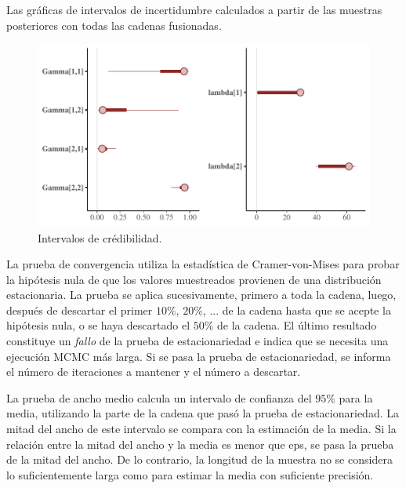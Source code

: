 \documentclass[a4paper]{article}\usepackage[]{graphicx}\usepackage[]{color}
\makeatletter
\def\maxwidth{ %
  \ifdim\Gin@nat@width>\linewidth
    \linewidth
  \else
    \Gin@nat@width
  \fi
}
\newenvironment{knitrout}{}{} %
\makeatother
\begin{document}
Las gráficas de intervalos de incertidumbre calculados a partir de las muestras posteriores con todas las cadenas fusionadas.

\begin{knitrout}
\color{fgcolor}\begin{figure}
\includegraphics[width=\maxwidth]{figure/unnamed-chunk-32-1} \caption[Intervalos de crédibilidad]{Intervalos de crédibilidad.}\label{fig:unnamed-chunk-32}
\end{figure}


\end{knitrout}

La prueba de convergencia utiliza la estadística de Cramer-von-Mises para probar la hipótesis nula de que los valores muestreados provienen de una distribución estacionaria. La prueba se aplica sucesivamente, primero a toda la cadena, luego, después de descartar el primer $10 \%$, $20 \%$, ... de la cadena hasta que se acepte la hipótesis nula, o se haya descartado el $50 \%$ de la cadena. El último resultado constituye un \emph{fallo} de la prueba de estacionariedad e indica que se necesita una ejecución MCMC más larga. Si se pasa la prueba de estacionariedad, se informa el número de iteraciones a mantener y el número a descartar.

La prueba de ancho medio calcula un intervalo de confianza del $95 \%$ para la media, utilizando la parte de la cadena que pasó la prueba de estacionariedad. La mitad del ancho de este intervalo se compara con la estimación de la media. Si la relación entre la mitad del ancho y la media es menor que eps, se pasa la prueba de la mitad del ancho. De lo contrario, la longitud de la muestra no se considera lo suficientemente larga como para estimar la media con suficiente precisión.
\end{document}
